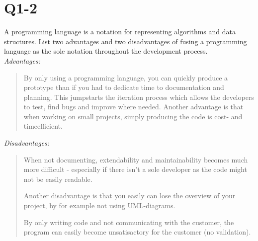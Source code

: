 \section{Q1-2} 
A programming language is a notation for representing algorithms and data structures. List two advantages and two disadvantages of fusing a programming language as the sole notation throughout the development process.\\

\emph{Advantages:}
\begin{quote}
By only using a programming language, you can quickly produce a prototype than if you had to dedicate time to documentation and planning. 
This jumpstarts the iteration process which allows the developers to test, find bugs and improve where needed.
Another advantage is that when working on small projects, simply producing the code is cost- and timeefficient.
\end{quote}

\emph{Disadvantages:}
\begin{quote}
When not documenting, extendability and maintainability becomes much more difficult - especially if there isn't a sole developer as the code might not be easily readable.

Another disadvantage is that you easily can lose the overview of your project, by for example not using UML-diagrams. 

By only writing code and not communicating with the customer, the program can easily become unsatisactory for the customer (no validation).
\end{quote}